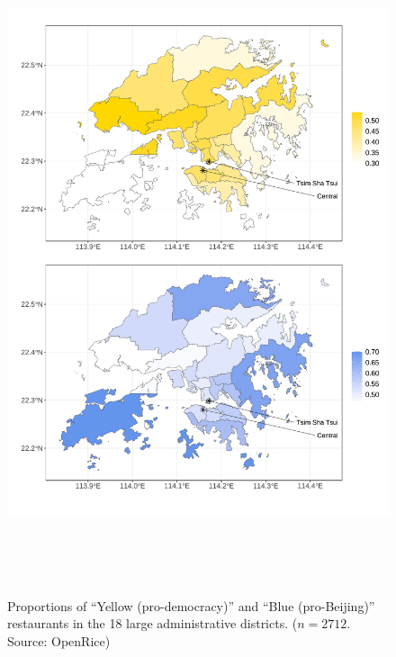 \documentclass[letterpaper, 12pt]{article}
\begin{document}
\begin{figure}[!h]
    \centering
    \includegraphics[width=15cm, height=19.5cm]{Visuals/heatmap.pdf}
     \caption{Proportions of ``Yellow (pro-democracy)'' and ``Blue (pro-Beijing)'' restaurants in the 18 large administrative districts. ($n = 2712$. Source: OpenRice)}
    \label{fig: heatmap}
\end{figure}
\end{document}
